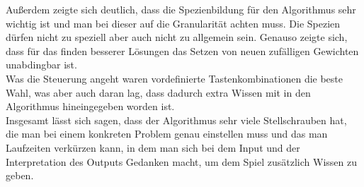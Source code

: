 \documentclass{hbrs-ecta-report}
\begin{document}
Außerdem zeigte sich deutlich, dass die Spezienbildung für den Algorithmus sehr wichtig ist und man bei dieser auf die Granularität achten muss. Die Spezien dürfen nicht zu speziell aber auch nicht zu allgemein sein.
Genauso zeigte sich, dass für das finden besserer Lösungen das Setzen von neuen zufälligen Gewichten unabdingbar ist.\\

Was die Steuerung angeht waren vordefinierte Tastenkombinationen die beste Wahl, was aber auch daran lag, dass dadurch extra Wissen mit in den Algorithmus hineingegeben worden ist.\\

Insgesamt lässt sich sagen, dass der Algorithmus sehr viele Stellschrauben hat, die man bei einem konkreten Problem genau einstellen muss und das man Laufzeiten verkürzen kann, in dem man sich bei dem Input und der Interpretation des Outputs Gedanken macht, um dem Spiel zusätzlich Wissen zu geben.


 
\end{document}
